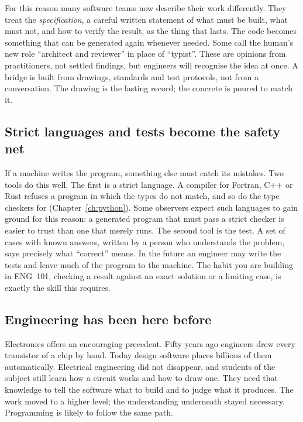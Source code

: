 For this reason many software teams now describe their work differently. They treat the
\emph{specification}, a careful written statement of what must be built, what must not,
and how to verify the result, as the thing that lasts. The code becomes something that
can be generated again whenever needed. Some call the human's new role ``architect and
reviewer'' in place of ``typist''. These are opinions from practitioners, not settled
findings, but engineers will recognise the idea at once. A bridge is built from drawings,
standards and test protocols, not from a conversation. The drawing is the lasting
record; the concrete is poured to match it.

\subsection*{Strict languages and tests become the safety net}

If a machine writes the program, something else must catch its mistakes. Two tools do
this well. The first is a strict language. A compiler for Fortran, C++ or Rust refuses a
program in which the types do not match, and so do the type checkers for \py
(Chapter~\ref{ch:python}). Some observers expect such languages to gain ground for this
reason: a generated program that must pass a strict checker is easier to trust than one
that merely runs. The second tool is the test. A set of cases with known answers, written
by a person who understands the problem, says precisely what ``correct'' means. In the
future an engineer may write the tests and leave much of the program to the machine. The
habit you are building in ENG~101, checking a result against an exact solution or a
limiting case, is exactly the skill this requires.

\subsection*{Engineering has been here before}

Electronics offers an encouraging precedent. Fifty years ago engineers drew every
transistor of a chip by hand. Today design software places billions of them
automatically. Electrical engineering did not disappear, and students of the subject
still learn how a circuit works and how to draw one. They need that knowledge to tell the
software what to build and to judge what it produces. The work moved to a higher level;
the understanding underneath stayed necessary. Programming is likely to follow the same
path.

